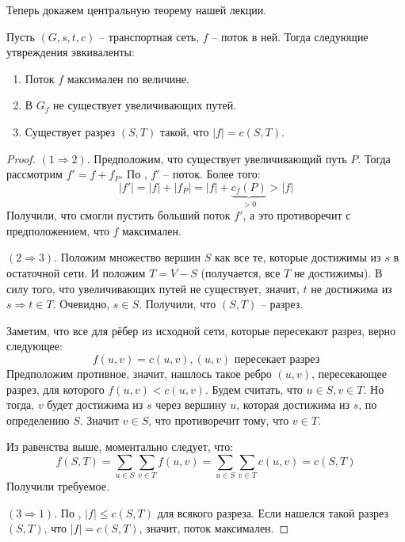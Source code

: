 Теперь докажем центральную теорему нашей лекции.

 Пусть $(G, s, t, c)$ -- транспортная сеть, $f$ -- поток в ней. Тогда следующие утвреждения эвкиваленты:
\begin{enumerate}
    \item Поток $f$ максимален по величине.
    \item В $G_f$ не существует увеличивающих путей.
    \item Существует разрез $(S, T)$ такой, что $|f| = c(S, T)$.
\end{enumerate}
\begin{proof}

    $(1 \Rightarrow 2).$ Предположим, что существует увеличивающий путь $P$. Тогда рассмотрим $f' = f + f_P$. По , $f'$ -- поток. Более того:
    \begin{equation*}
        |f'| = |f| + |f_P| = |f| + \underbrace{c_f(P)}_{>0} > |f|
    \end{equation*}
    Получили, что смогли пустить больший поток $f'$, а это противоречит с предположением, что $f$ максимален.

    $(2 \Rightarrow 3).$ Положим множество вершин $S$ как все те, которые достижимы из $s$ в остаточной сети. И положим $T = V - S$ (получается, все $T$ не достижимы).
    В силу того, что увеличивающих путей не существует, значит, $t$ не достижима из $s \Rightarrow t \in T$. Очевидно, $s \in S$. Получили, что $(S, T)$ -- разрез.

    Заметим, что все для рёбер из исходной сети, которые пересекают разрез, верно следующее:
    \begin{equation*}
        f(u, v) = c(u, v), \text{$(u, v)$ пересекает разрез}
    \end{equation*}
    Предположим противное, значит, нашлось такое ребро $(u, v)$, пересекающее разрез, для которого $f(u, v) < c(u, v)$. Будем считать, что $u \in S, v \in T$.
    Но тогда, $v$ будет достижима из $s$ через вершину $u$, которая достижима из $s$, по определению $S$. Значит $v \in S$, что противоречит тому, что $v \in T$.

    Из равенства выше, моментально следует, что:
    \begin{equation*}
        f(S, T) = \sum\limits_{u \in S} \sum\limits_{v \in T} f(u, v) = \sum\limits_{u \in S} \sum\limits_{v \in T} c(u, v) = c(S, T)
    \end{equation*}
    Получили требуемое.

    $(3 \Rightarrow 1).$ По , $|f| \leq c(S, T)$ для всякого разреза. Если нашелся такой разрез $(S, T)$, что $|f| = c(S, T)$, значит, поток максимален. 

\end{proof}

